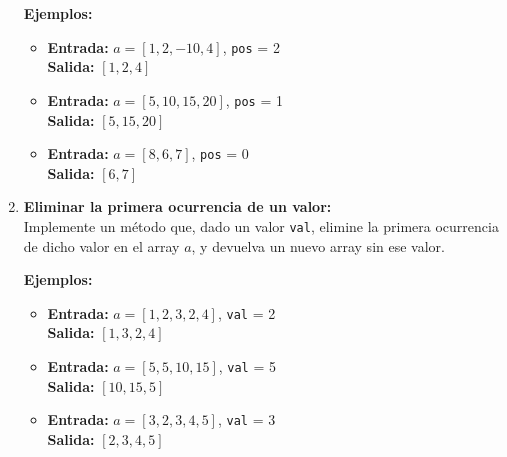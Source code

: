 \begin{enumerate}[label=\alph*)]
    \textbf{Ejemplos:}
    \begin{itemize}
        \item \textbf{Entrada:} \(a = [1, 2, -10, 4]\), \texttt{pos} = 2 \\
        \textbf{Salida:} \([1, 2, 4]\)
        \item \textbf{Entrada:} \(a = [5, 10, 15, 20]\), \texttt{pos} = 1 \\
        \textbf{Salida:} \([5, 15, 20]\)
        \item \textbf{Entrada:} \(a = [8, 6, 7]\), \texttt{pos} = 0 \\
        \textbf{Salida:} \([6, 7]\)
    \end{itemize}

    \item \textbf{Eliminar la primera ocurrencia de un valor:} \\
    Implemente un método que, dado un valor \texttt{val}, elimine la primera ocurrencia de dicho valor en el array \(a\), y devuelva un nuevo array sin ese valor.
    
    \textbf{Ejemplos:}
    \begin{itemize}
        \item \textbf{Entrada:} \(a = [1, 2, 3, 2, 4]\), \texttt{val} = 2 \\
        \textbf{Salida:} \([1, 3, 2, 4]\)
        \item \textbf{Entrada:} \(a = [5, 5, 10, 15]\), \texttt{val} = 5 \\
        \textbf{Salida:} \([10, 15, 5]\)
        \item \textbf{Entrada:} \(a = [3, 2, 3, 4, 5]\), \texttt{val} = 3 \\
        \textbf{Salida:} \([2, 3, 4, 5]\)
    \end{itemize}
\end{enumerate}